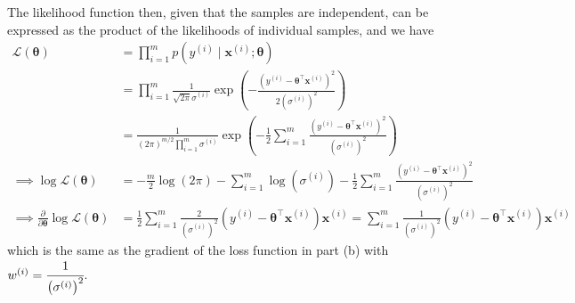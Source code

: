 The likelihood function then, given that the samples are independent, can be expressed as the product of the likelihoods of individual samples, and we have
\begin{align*}
    \mathcal{L}(\boldsymbol{\theta})
     & =
    \prod_{i=1}^{m}
    p\left(y^{(i)} \mid \mathbf{x}^{(i)} ; \boldsymbol{\theta}\right)
    \\ & =
    \prod_{i=1}^{m}
    \frac{1}{\sqrt{2 \pi} \sigma^{(i)}} \exp \left(-\frac{{\left(y^{(i)}-\boldsymbol{\theta}^{\top} \mathbf{x}^{(i)}\right)}^{2}}{2{\left(\sigma^{(i)}\right)}^{2}}\right)
    \\ & =
    \frac{1}{\left(2 \pi\right)^{m/2} \prod_{i=1}^{m} \sigma^{(i)}}
    \exp \left(
    -\frac{1}{2}
    \sum_{i=1}^{m}
    \frac{{\left(y^{(i)}-\boldsymbol{\theta}^{\top} \mathbf{x}^{(i)}\right)}^{2}}{{\left(\sigma^{(i)}\right)}^{2}}
    \right)
    \\
    \implies
    \log \mathcal{L}(\boldsymbol{\theta})
     & =
    -\frac{m}{2} \log(2 \pi) - \sum_{i=1}^{m} \log \left( \sigma^{(i)} \right)
    -\frac{1}{2}
    \sum_{i=1}^{m}
    \frac{{\left(y^{(i)}-\boldsymbol{\theta}^{\top} \mathbf{x}^{(i)}\right)}^{2}}{{\left(\sigma^{(i)}\right)}^{2}}
    \\
    \implies
    \frac{\partial}{\partial \boldsymbol{\theta}} \log \mathcal{L}(\boldsymbol{\theta})
     & =
    \frac{1}{2}
    \sum_{i=1}^{m}
    \frac{2}{\left(\sigma^{(i)}\right)^{2}}
    \left(y^{(i)}-\boldsymbol{\theta}^{\top} \mathbf{x}^{(i)}\right)
    \mathbf{x}^{(i)}
    =
    \sum_{i=1}^{m}
    \frac{1}{\left(\sigma^{(i)}\right)^{2}}
    \left(y^{(i)}-\boldsymbol{\theta}^{\top} \mathbf{x}^{(i)}\right)
    \mathbf{x}^{(i)}
\end{align*}
which is the same as the gradient of the loss function in part (b) with \( w^{(i)} = \cfrac{1}{\left(\sigma^{(i)}\right)^{2}} \).
